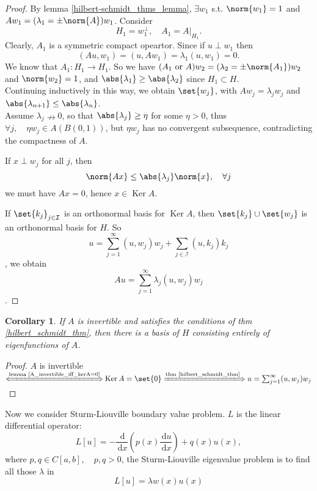 \documentclass[a4paper]{book}
\newtheorem{coro}[thm]{Corollary}
{
    \theoremstyle{nonumberplain}
    \theoremheaderfont{\normalfont}
    \theorembodyfont{\normalfont}
    \theoremsymbol{\mbox{$\Box$}}
    \newtheorem{proof}{proof}
}
{
    \theoremstyle{nonumberplain}
    \newtheorem{myDef}{Definition}
}
\newcommand\diff{\,\mathrm{d}}
\newcommand\xiff\xLongleftrightarrow
\newcommand\ximplies\xLongrightarrow
\newcommand\nto\nrightarrow
\DeclarePairedDelimiter{\norm}\lVert\rVert
\DeclarePairedDelimiter{\set}\lbrace\rbrace
\DeclarePairedDelimiter{\abs}\lvert\rvert
\DeclareMathOperator{\Ker}{Ker}
\begin{document}
\begin{proof}
    By lemma \ref{hilbert-schmidt_thms_lemma}, $\exists w_1$ s.t. $\norm{w_1}=1$ and $Aw_1 = (\lambda_1 = \pm \norm{A}) w_1$. Consider
    \[H_1 = w_1^{\bot}, \quad \left. A_1 = A \right|_{H_1}.\]
    Clearly, $A_1$ is a symmetric compact opeartor. Since if $u \perp w_1$ then
    \[(Au, w_1)=(u,Aw_1)=\lambda_1(u,w_1)=0.\]
    We know that $A_1 \colon H_1 \to H_1$.
    So we have $(A_1 \text{ or } A) w_2=(\lambda_2 = \pm \norm{A_1})w_2$ and $\norm{w_2} = 1$, and $\abs{\lambda_1} \geq \abs{\lambda_2}$ since $H_1 \subset H$.\\
    Continuing inductively in this way, we obtain $\set{w_j}$, with $Aw_j=\lambda_j w_j$ and $\abs{\lambda_{n+1}} \leq \abs{\lambda_{n}}$.\\
    Assume $\lambda_j \nto 0$, so that $\abs{\lambda_j} \geq \eta$ for some $\eta > 0$, thus $\forall j, \quad \eta w_j \in A(B(0, 1))$, but ${\eta w_j}$ has no convergent subsequence, contradicting the compactness of $A$.

    If $x \perp w_j$ for all $j$, then 
    \[\norm{Ax} \leq \abs{\lambda_j}\norm{x}, \quad \forall j\]
    we must have $Ax=0$, hence $x \in \Ker A$.

    If $\set{k_j}_{j \in \mathcal{I}}$ is an orthonormal basis for $\Ker A$, then $\set{k_j} \cup \set{w_j}$ is an orthonormal basis for $H$. So
    \[u = \sum_{j=1}^{\infty}(u,w_j)w_j + \sum_{j \in \mathcal{I}}(u, k_j)k_j\], 
    we obtain
    \[Au = \sum_{j=1}^{\infty}\lambda_j(u,w_j)w_j\].
\end{proof}
\begin{coro}\label{invertible_to_basis}
    If $A$ is invertible and satisfies the conditions of thm \ref{hilbert_schmidt_thm}, then there is a basis of $H$ consisting entirely of eigenfunctions of $A$.
\end{coro}
\begin{proof}
    $A$ is invertible $\xiff{\text{lemma \ref{A_invertible_iff_kerA=0}}} \Ker{A} =\set{0} \ximplies{\text{thm \ref{hilbert_schmidt_thm}}} u = \sum_{j=1}^{\infty}(u,w_j)w_j$
\end{proof}
Now we consider Sturm-Liouville boundary value problem. $L$ is the linear differential operator:
\begin{equation}
    L[u]=-\frac{\diff}{\diff x}\left(p(x)\frac{\diff u}{\diff x}\right) + q(x)u(x), 
\end{equation}
where $p,q \in C[a,b], \quad p,q > 0$, the Sturm-Liouville eigenvalue problem is to find all those $\lambda$ in
\begin{equation}\label{eq:sturm_liouville_eigenfunction}
    L[u] = \lambda w(x)u(x)
\end{equation}
\end{document}
